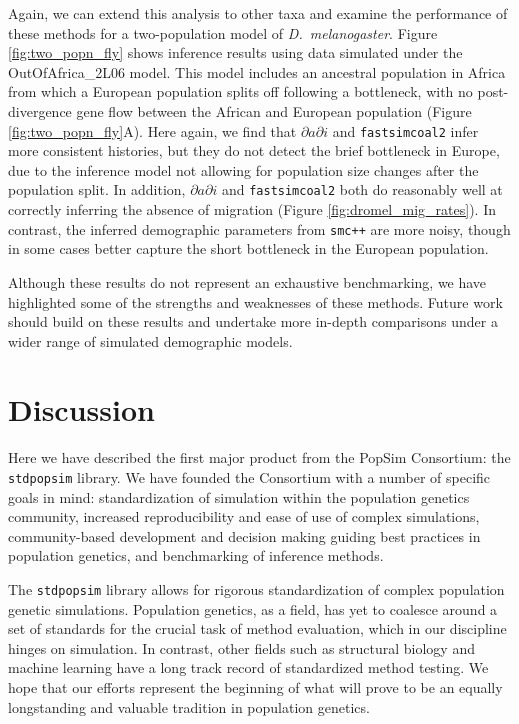 \documentclass[12pt,halfline,a4paper]{ouparticle}
\newcommand{\stdpopsim}{\texttt{stdpopsim}\xspace}
\newcommand{\dadi}{$\partial a \partial i$\xspace}
\newcommand{\smcpp}{\texttt{smc++}\xspace}
\newcommand{\fastsimcoal}{\texttt{fastsimcoal2}\xspace}
\begin{document}
Again, we can extend this analysis to other taxa and examine the performance of these methods
for a two-population model of \textit{D.~melanogaster}. Figure
\ref{fig:two_popn_fly} shows inference results using data simulated under
the OutOfAfrica\_2L06 model. This model includes an ancestral population in
Africa from which a European population splits off following a bottleneck, with no
post-divergence gene flow between the African and European population (Figure \ref{fig:two_popn_fly}A).
Here again, we find that \dadi and \fastsimcoal infer more consistent histories,
but they do not detect the brief bottleneck in Europe, due to the inference model
not allowing for population size changes after the population split. In addition, \dadi
and \fastsimcoal both do reasonably well at correctly inferring the absence of
migration (Figure \ref{fig:dromel_mig_rates}). In contrast, the inferred
demographic parameters from \smcpp are more noisy, though in some cases better
capture the short bottleneck in the European population.

Although these results do not represent an exhaustive benchmarking,
we have highlighted some of the strengths and weaknesses of these methods.
Future work should build on these results and undertake more in-depth comparisons
under a wider range of simulated demographic models.

\section*{Discussion}

Here we have described the first major product from the PopSim Consortium:
the \stdpopsim library. We have founded the Consortium with a number of specific goals in mind:
standardization of simulation within the population genetics community,
increased reproducibility and ease of use of complex simulations,
community-based development and decision making guiding best practices in population genetics,
and benchmarking of inference methods.

The \stdpopsim library allows for rigorous
standardization of complex population genetic simulations. Population genetics, as a field,
has yet to coalesce around a set of standards for the crucial task of method
evaluation, which in our discipline hinges on simulation. In contrast, other fields such as
structural biology \citep{moult1995large} and machine learning \citep{russakovsky2015imagenet} have a long track record
of standardized method testing. We hope that our efforts represent the beginning of what
will prove to be an equally longstanding and valuable tradition in population genetics.
\end{document}

